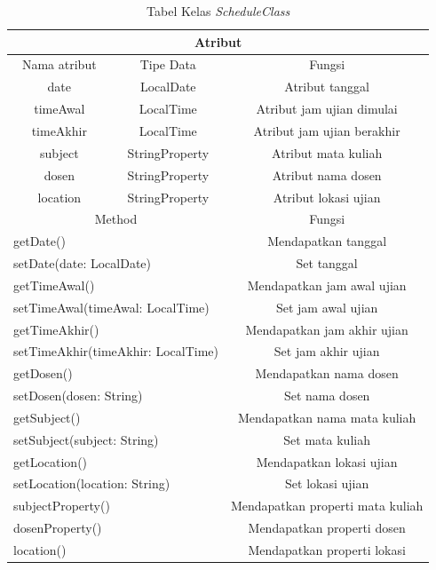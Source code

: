 \begin{table}[H]
	\centering
		\caption{Tabel Kelas \textit{ScheduleClass}}
		\label{tab:schedule_class}
		\begin{tabular}{ | c | c | c |}
			\hline
				\multicolumn{3}{|c|}{Atribut} \\ \hline 
				Nama atribut & Tipe Data  & Fungsi \\ \hline
				date & LocalDate & Atribut tanggal\\ \hline
				timeAwal & LocalTime & Atribut jam ujian dimulai\\ \hline
				timeAkhir & LocalTime & Atribut jam ujian berakhir\\ \hline
				subject & StringProperty & Atribut mata kuliah\\ \hline
				dosen & StringProperty & Atribut nama dosen\\ \hline
				location & StringProperty & Atribut lokasi ujian\\ \hline
				\multicolumn{2}{|c|}{Method} & Fungsi \\ \hline
				\multicolumn{2}{|l|}{getDate()} & Mendapatkan tanggal\\ \hline
				\multicolumn{2}{|l|}{setDate(date: LocalDate)} & Set tanggal \\ \hline
				\multicolumn{2}{|l|}{getTimeAwal()} & Mendapatkan jam awal ujian \\ \hline
				\multicolumn{2}{|l|}{setTimeAwal(timeAwal: LocalTime)} & Set jam awal ujian\\ \hline
				\multicolumn{2}{|l|}{getTimeAkhir()} & Mendapatkan jam akhir ujian\\ \hline
				\multicolumn{2}{|l|}{setTimeAkhir(timeAkhir: LocalTime)} & Set jam akhir ujian\\ \hline
				\multicolumn{2}{|l|}{getDosen()} & Mendapatkan nama dosen\\ \hline
				\multicolumn{2}{|l|}{setDosen(dosen: String)} & Set nama dosen\\ \hline
				\multicolumn{2}{|l|}{getSubject()} & Mendapatkan nama mata kuliah\\ \hline
				\multicolumn{2}{|l|}{setSubject(subject: String)}& Set mata kuliah \\ \hline
				\multicolumn{2}{|l|}{getLocation()} & Mendapatkan lokasi ujian\\ \hline
				\multicolumn{2}{|l|}{setLocation(location: String)} & Set lokasi ujian\\ \hline
				\multicolumn{2}{|l|}{subjectProperty()} & Mendapatkan properti mata kuliah\\ \hline
				\multicolumn{2}{|l|}{dosenProperty()} & Mendapatkan properti dosen\\ \hline
				\multicolumn{2}{|l|}{location()} & Mendapatkan properti lokasi\\ \hline
		\end{tabular}
\end{table}

